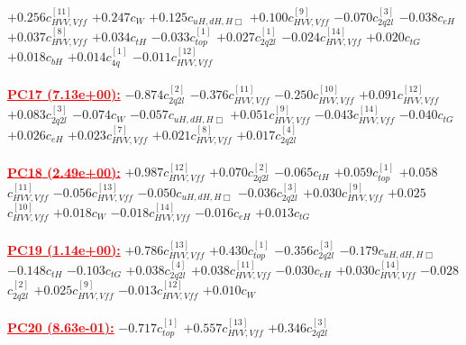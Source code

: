 \documentclass{article}
\begin{document}
{$+0.256$}{\rm $c_{HVV,Vff}^{[11]}$}
{$+0.247$}{\rm $c_{W}$}
{$+0.125$}{\rm $c_{uH,dH,H\Box}$}
{$+0.100$}{\rm $c_{HVV,Vff}^{[9]}$}
{$-0.070$}{\rm $c_{2q2l}^{[3]}$}
{$-0.038$}{\rm $c_{eH}$}
{$+0.037$}{\rm $c_{HVV,Vff}^{[8]}$}
{$+0.034$}{\rm $c_{tH}$}
{$-0.033$}{\rm $c_{top}^{[1]}$}
{$+0.027$}{\rm $c_{2q2l}^{[1]}$}
{$-0.024$}{\rm $c_{HVV,Vff}^{[14]}$}
{$+0.020$}{\rm $c_{tG}$}
{$+0.018$}{\rm $c_{bH}$}
{$+0.014$}{\rm $c_{4q}^{[1]}$}
{$-0.011$}{\rm $c_{HVV,Vff}^{[12]}$}
 \nonumber \\ \nonumber \\
\noindent \textcolor{red}{\underline{\bf{PC17} (7.13e+00):}}
{$-0.874$}{\rm $c_{2q2l}^{[2]}$}
{$-0.376$}{\rm $c_{HVV,Vff}^{[11]}$}
{$-0.250$}{\rm $c_{HVV,Vff}^{[10]}$}
{$+0.091$}{\rm $c_{HVV,Vff}^{[12]}$}
{$+0.083$}{\rm $c_{2q2l}^{[3]}$}
{$-0.074$}{\rm $c_{W}$}
{$-0.057$}{\rm $c_{uH,dH,H\Box}$}
{$+0.051$}{\rm $c_{HVV,Vff}^{[9]}$}
{$-0.043$}{\rm $c_{HVV,Vff}^{[14]}$}
{$-0.040$}{\rm $c_{tG}$}
{$+0.026$}{\rm $c_{eH}$}
{$+0.023$}{\rm $c_{HVV,Vff}^{[7]}$}
{$+0.021$}{\rm $c_{HVV,Vff}^{[8]}$}
{$+0.017$}{\rm $c_{2q2l}^{[4]}$}
 \nonumber \\ \nonumber \\
\noindent \textcolor{red}{\underline{\bf{PC18} (2.49e+00):}}
{$+0.987$}{\rm $c_{HVV,Vff}^{[12]}$}
{$+0.070$}{\rm $c_{2q2l}^{[2]}$}
{$-0.065$}{\rm $c_{tH}$}
{$+0.059$}{\rm $c_{top}^{[1]}$}
{$+0.058$}{\rm $c_{HVV,Vff}^{[11]}$}
{$-0.056$}{\rm $c_{HVV,Vff}^{[13]}$}
{$-0.050$}{\rm $c_{uH,dH,H\Box}$}
{$-0.036$}{\rm $c_{2q2l}^{[3]}$}
{$+0.030$}{\rm $c_{HVV,Vff}^{[9]}$}
{$+0.025$}{\rm $c_{HVV,Vff}^{[10]}$}
{$+0.018$}{\rm $c_{W}$}
{$-0.018$}{\rm $c_{HVV,Vff}^{[14]}$}
{$-0.016$}{\rm $c_{eH}$}
{$+0.013$}{\rm $c_{tG}$}
 \nonumber \\ \nonumber \\
\noindent \textcolor{red}{\underline{\bf{PC19} (1.14e+00):}}
{$+0.786$}{\rm $c_{HVV,Vff}^{[13]}$}
{$+0.430$}{\rm $c_{top}^{[1]}$}
{$-0.356$}{\rm $c_{2q2l}^{[3]}$}
{$-0.179$}{\rm $c_{uH,dH,H\Box}$}
{$-0.148$}{\rm $c_{tH}$}
{$-0.103$}{\rm $c_{tG}$}
{$+0.038$}{\rm $c_{2q2l}^{[4]}$}
{$+0.038$}{\rm $c_{HVV,Vff}^{[11]}$}
{$-0.030$}{\rm $c_{eH}$}
{$+0.030$}{\rm $c_{HVV,Vff}^{[14]}$}
{$-0.028$}{\rm $c_{2q2l}^{[2]}$}
{$+0.025$}{\rm $c_{HVV,Vff}^{[9]}$}
{$-0.013$}{\rm $c_{HVV,Vff}^{[12]}$}
{$+0.010$}{\rm $c_{W}$}
 \nonumber \\ \nonumber \\
\noindent \textcolor{red}{\underline{\bf{PC20} (8.63e-01):}}
{$-0.717$}{\rm $c_{top}^{[1]}$}
{$+0.557$}{\rm $c_{HVV,Vff}^{[13]}$}
{$+0.346$}{\rm $c_{2q2l}^{[3]}$}
\end{document}
